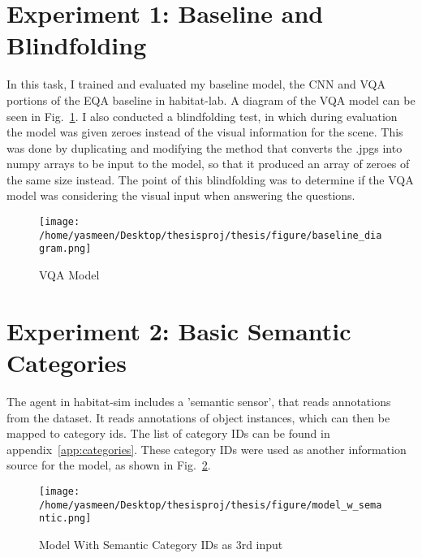 \section{Experiment 1: Baseline and Blindfolding}
\label{sec:exp_1}
In this task, I trained and evaluated my baseline model, the CNN and VQA portions of the EQA baseline in habitat-lab. A diagram of the VQA model can be seen in Fig.~\ref{fig:baseline_model}. I also conducted a blindfolding test, in which during evaluation the model was given zeroes instead of the visual information for the scene. This was done by duplicating and modifying the method that converts the .jpgs into numpy arrays to be input to the model, so that it produced an array of zeroes of the same size instead. The point of this blindfolding was to determine if the VQA model was considering the visual input when answering the questions.

\begin{figure}[h]
     \centering
     \texttt{[image: /home/yasmeen/Desktop/thesisproj/thesis/figure/baseline\_diagram.png]}
     \caption{VQA Model}
     \label{fig:baseline_model}
\end{figure}

\section{Experiment 2: Basic Semantic Categories}
\label{sec:exp_2}
The agent in habitat-sim includes a 'semantic sensor', that reads annotations from the dataset. It reads annotations of object instances, which can then be mapped to category ids. The list of category IDs can be found in appendix~\ref{app:categories}. These category IDs were used as another information source for the model, as shown in Fig.~\ref{fig:category_model}.

\begin{figure}[h]
     \centering
     \texttt{[image: /home/yasmeen/Desktop/thesisproj/thesis/figure/model\_w\_semantic.png]}
     \caption{Model With Semantic Category IDs as 3rd input}
     \label{fig:category_model}
\end{figure}
